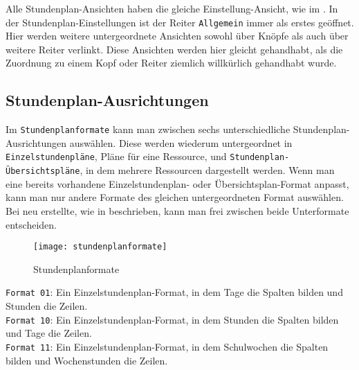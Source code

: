 Alle Stundenplan-Ansichten haben die gleiche Einstellung-Ansicht, wie im . In der Stundenplan-Einstellungen ist der Reiter \texttt{Allgemein} immer als erstes geöffnet. Hier werden weitere untergeordnete Ansichten sowohl über Knöpfe als auch über weitere Reiter verlinkt. Diese Ansichten werden hier gleicht gehandhabt, als die Zuordnung zu einem Kopf oder Reiter ziemlich willkürlich gehandhabt wurde.\\

\vspace{20pt}

\subsection{Stundenplan-Ausrichtungen}
\label{sec:stundenplan-formate}

\noindent
Im \texttt{Stundenplanformate} kann man zwischen sechs unterschiedliche Stundenplan-Ausrichtungen auswählen. Diese werden wiederum untergeordnet in \texttt{Einzelstundenpläne}, Pläne für eine Ressource, und \texttt{Stundenplan-Übersichtspläne}, in dem mehrere Ressourcen dargestellt werden. Wenn man eine bereits vorhandene Einzelstundenplan- oder Übersichtsplan-Format anpasst, kann man nur andere Formate des gleichen untergeordneten Format auswählen. Bei neu erstellte, wie in  beschrieben, kann man frei zwischen beide Unterformate entscheiden.\\

\begin{wrapfigure}{r}{0.4\textwidth}
	\vspace{-14pt}
	\centering
	\texttt{[image: stundenplanformate]}
	\vspace{-5pt}
	\caption{Stundenplanformate}
	\label{fig:stundenplanformate}
	\vspace{-15pt}
\end{wrapfigure}

\noindent
\texttt{Format 01}: Ein Einzelstundenplan-Format, in dem Tage die Spalten bilden und Stunden die Zeilen.\\

\noindent
\texttt{Format 10}: Ein Einzelstundenplan-Format, in dem Stunden die Spalten bilden und Tage die Zeilen.\\

\noindent
\texttt{Format 11}: Ein Einzelstundenplan-Format, in dem Schulwochen die Spalten bilden und Wochenstunden die Zeilen.\\

